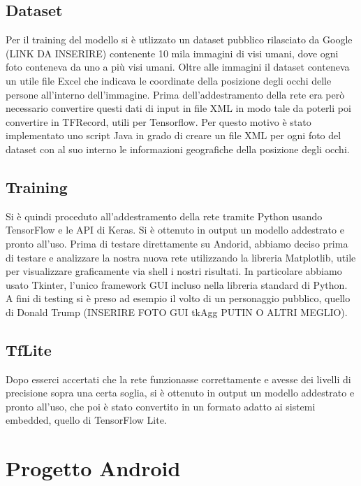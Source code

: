 \documentclass[11pt]{article}
\begin{document}
\subsection{Dataset}
Per il training del modello si è utlizzato un dataset pubblico rilasciato da Google (LINK DA INSERIRE) contenente 10 mila immagini di visi umani, dove ogni foto conteneva da uno a più visi umani.
\newline
Oltre alle immagini il dataset conteneva un utile file Excel che indicava le coordinate della posizione degli occhi delle persone all'interno dell'immagine.
\newline \newline
Prima dell'addestramento della rete era però necessario convertire questi dati di input in file XML in modo tale da poterli poi convertire in TFRecord, utili per Tensorflow. Per questo motivo è stato implementato uno script Java in grado di creare un file XML per ogni foto del dataset con al suo interno le informazioni geografiche della posizione degli occhi. 


\subsection{Training}
Si è quindi proceduto all’addestramento della rete
tramite Python usando TensorFlow e le API di Keras. Si è ottenuto in output un modello addestrato
e pronto all’uso. 
\newline \newline
Prima di testare direttamente su Andorid, abbiamo deciso prima di testare e analizzare la nostra nuova rete utilizzando la libreria Matplotlib, utile per visualizzare graficamente via shell i nostri risultati. In particolare abbiamo usato Tkinter, l'unico framework GUI incluso nella libreria standard di Python.
A fini di testing si è preso ad esempio il volto di un
personaggio pubblico, quello di Donald Trump (INSERIRE FOTO GUI tkAgg PUTIN O ALTRI MEGLIO).


\subsection{TfLite}
Dopo esserci accertati che la rete funzionasse correttamente e avesse dei livelli di precisione sopra una certa soglia, si è ottenuto in output un modello addestrato
e pronto all’uso, che poi è stato convertito in un formato adatto ai sistemi embedded, quello di TensorFlow Lite.


\newpage
\section{Progetto Android}
\label{sec:others}
\end{document}
